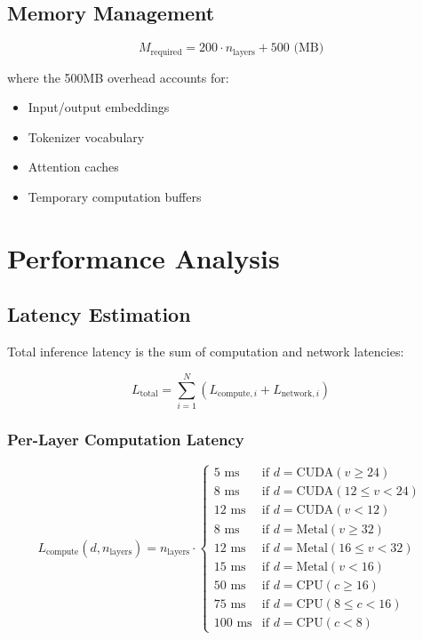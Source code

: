 \documentclass[12pt,a4paper]{article}
\begin{document}
\subsection{Memory Management}

\begin{equation}
M_{\text{required}} = 200 \cdot n_{\text{layers}} + 500 \text{ (MB)}
\end{equation}

where the 500MB overhead accounts for:
\begin{itemize}
    \item Input/output embeddings
    \item Tokenizer vocabulary
    \item Attention caches
    \item Temporary computation buffers
\end{itemize}

\section{Performance Analysis}

\subsection{Latency Estimation}

Total inference latency is the sum of computation and network latencies:

\begin{equation}
L_{\text{total}} = \sum_{i=1}^{N} (L_{\text{compute},i} + L_{\text{network},i})
\end{equation}

\subsubsection{Per-Layer Computation Latency}

\begin{equation}
L_{\text{compute}}(d, n_{\text{layers}}) = n_{\text{layers}} \cdot \begin{cases}
5 \text{ ms} & \text{if } d = \text{CUDA}(v \geq 24) \\
8 \text{ ms} & \text{if } d = \text{CUDA}(12 \leq v < 24) \\
12 \text{ ms} & \text{if } d = \text{CUDA}(v < 12) \\
8 \text{ ms} & \text{if } d = \text{Metal}(v \geq 32) \\
12 \text{ ms} & \text{if } d = \text{Metal}(16 \leq v < 32) \\
15 \text{ ms} & \text{if } d = \text{Metal}(v < 16) \\
50 \text{ ms} & \text{if } d = \text{CPU}(c \geq 16) \\
75 \text{ ms} & \text{if } d = \text{CPU}(8 \leq c < 16) \\
100 \text{ ms} & \text{if } d = \text{CPU}(c < 8)
\end{cases}
\end{equation}
\end{document}
